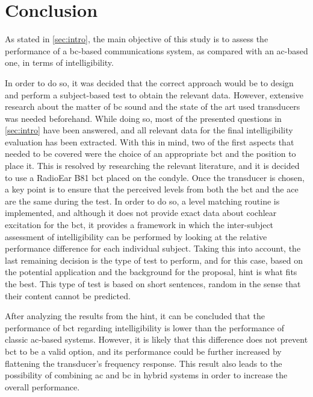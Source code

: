 \section{Conclusion}\label{sec:conclusion}
As stated in \autoref{sec:intro}, the main objective of this study is to assess the performance of a \gls{bc}-based communications system, as compared with an \gls{ac}-based one, in terms of intelligibility.

In order to do so, it was decided that the correct approach would be to design and perform a subject-based test to obtain the relevant data. However, extensive research about the matter of \gls{bc} sound and the state of the art used transducers was needed beforehand.
While doing so, most of the presented questions in \autoref{sec:intro} have been answered, and all relevant data for the final intelligibility evaluation has been extracted.
With this in mind, two of the first aspects that needed to be covered were the choice of an appropriate \gls{bct} and the position to place it. This is resolved by researching the relevant literature, and it is decided to use a RadioEar B81 \gls{bct} placed on the condyle.
Once the transducer is chosen, a key point is to ensure that the perceived levels from both the \gls{bct} and the \gls{ace} are the same during the test. In order to do so, a level matching routine is implemented, and although it does not provide exact data about cochlear excitation for the \gls{bct}, it provides a framework in which the inter-subject assessment of intelligibility can be performed by looking at the relative performance difference for each individual subject. Taking this into account, the last remaining decision is the type of test to perform, and for this case, based on the potential application and the background for the proposal, \gls{hint} is what fits the best. This type of test is based on short sentences, random in the sense that their content cannot be predicted.

After analyzing the results from the \gls{hint}, it can be concluded that the performance of \gls{bct} regarding intelligibility is lower than the performance of classic \gls{ac}-based systems. However, it is likely that this difference does not prevent \gls{bct} to be a valid option, and its performance could be further increased by flattening the transducer's frequency response. This result also leads to the possibility of combining \gls{ac} and \gls{bc} in hybrid systems in order to increase the overall performance.





